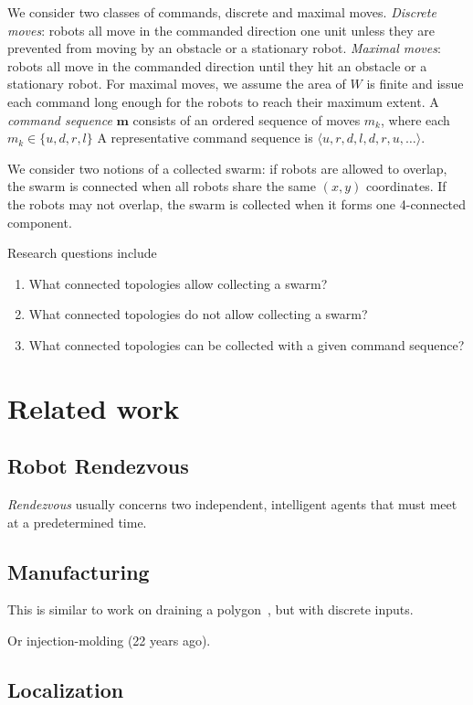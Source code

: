 \documentclass[letterpaper, 10 pt, conference]{ieeeconf}
\begin{document}
We consider two classes of commands, discrete and maximal moves.
\emph{Discrete moves}: robots all move in the commanded direction one unit unless they are prevented from moving by an obstacle or a stationary robot.
\emph{Maximal moves}: robots all move in the commanded direction until they hit an obstacle or a stationary robot. For maximal moves, we assume the area of $W$ is finite and issue each command long enough for the robots to reach their maximum extent.
A \emph{command sequence} $\bm{m}$ consists of an ordered sequence of moves $m_k$, where each $m_k\in\{u,d,r,l\}$  
A representative command sequence is $\langle u,r,d,l,d,r,u,\ldots\rangle$.
  
  We consider two notions of a collected swarm:  if robots are allowed to overlap, the swarm is connected when all robots share the same $(x,y)$ coordinates.  If the robots may not overlap, the swarm is collected when it forms one 4-connected component.
  
  
  Research questions include
  \begin{enumerate}
  \item What connected topologies allow collecting a swarm?
  \item What connected topologies do not allow collecting a swarm?
  \item What connected topologies can be collected with a given command sequence?
  \end{enumerate}
  
  
  \section{Related work}
  
  \subsection{Robot Rendezvous}
  \emph{Rendezvous} usually concerns two independent, intelligent agents that must meet at a predetermined time.
  
  \subsection{Manufacturing}
  
  This is similar to work on draining a polygon~\cite{aloupis2014draining}, but with discrete inputs.  
  
  Or injection-molding (22 years ago).
  
  \subsection{Localization}
  
\end{document}
